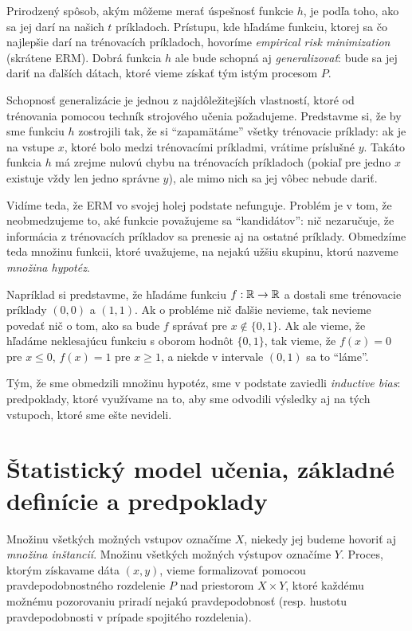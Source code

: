 Prirodzený spôsob, akým môžeme merať úspešnosť funkcie $h$, je podľa
toho, ako sa jej darí na našich $t$ príkladoch. Prístupu, kde hľadáme
funkciu, ktorej sa čo najlepšie darí na trénovacích príkladoch, hovoríme
\emph{empirical risk minimization} (skrátene ERM). Dobrá funkcia $h$ ale
bude schopná aj \emph{generalizovať}: bude sa jej dariť na ďalších
dátach, ktoré vieme získať tým istým procesom $P$.

Schopnosť generalizácie je jednou z najdôležitejších vlastností, ktoré
od trénovania pomocou techník strojového učenia požadujeme. Predstavme si,
že by sme funkciu $h$ zostrojili tak, že si ``zapamätáme'' všetky trénovacie
príklady: ak je na vstupe $x$, ktoré bolo medzi trénovacími príkladmi,
vrátime príslušné $y$. Takáto funkcia $h$ má zrejme nulovú chybu na
trénovacích príkladoch (pokiaľ pre jedno $x$ existuje vždy len
jedno správne $y$), ale mimo nich sa jej vôbec nebude dariť.

Vidíme teda, že ERM vo svojej holej podstate nefunguje. Problém je v tom,
že neobmedzujeme to, aké funkcie považujeme sa ``kandidátov'': nič
nezaručuje, že informácia z trénovacích príkladov sa prenesie aj na
ostatné príklady. Obmedzíme teda množinu funkcii, ktoré uvažujeme,
na nejakú užšiu skupinu, ktorú nazveme \emph{množina hypotéz}.

Napríklad si predstavme, že hľadáme funkciu $f : \mathbb{R} \to \mathbb{R}$ a dostali
sme trénovacie príklady $(0, 0)$ a $(1, 1)$. Ak o probléme nič ďalšie
nevieme, tak nevieme povedať nič o tom, ako sa bude $f$ správať pre
$x \not\in \{0, 1\}$. Ak ale vieme, že hľadáme neklesajúcu funkciu
s oborom hodnôt $\{0, 1\}$, tak vieme, že $f(x) = 0$ pre $x \leq 0$,
$f(x) = 1$ pre $x \geq 1$, a niekde v intervale $(0, 1)$ sa to ``láme''.

Tým, že sme obmedzili množinu hypotéz, sme v podstate zaviedli
\emph{inductive bias}: predpoklady, ktoré využívame na to, aby
sme odvodili výsledky aj na tých vstupoch, ktoré sme ešte nevideli.


\section{Štatistický model učenia, základné definície a predpoklady}
\label{ch1:stat_lr_fw}

Množinu všetkých možných vstupov označíme $X$, niekedy jej budeme hovoriť aj
\emph{množina inštancií}. Množinu všetkých možných výstupov označíme $Y$.
Proces, ktorým získavame dáta $(x, y)$, vieme formalizovať pomocou
pravdepodobnostného rozdelenie $P$ nad priestorom $X \times Y$, ktoré
každému možnému pozorovaniu priradí nejakú pravdepodobnosť (resp. hustotu
pravdepodobnosti v prípade spojitého rozdelenia).

